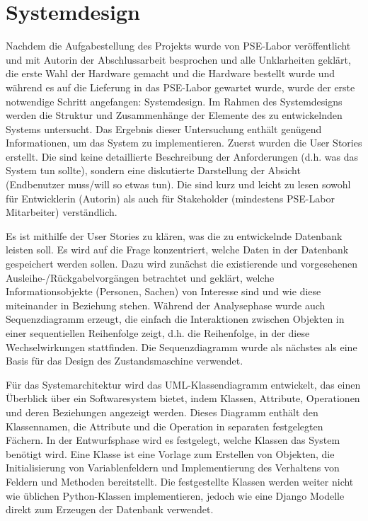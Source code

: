 \chapter{Systemdesign}
\label{sec:design}
Nachdem die Aufgabestellung des Projekts wurde von PSE-Labor veröffentlicht und mit Autorin der Abschlussarbeit besprochen und alle Unklarheiten geklärt, die erste Wahl der Hardware gemacht und die Hardware bestellt wurde und während es auf die Lieferung in das PSE-Labor gewartet wurde, wurde der erste notwendige Schritt angefangen: Systemdesign. Im Rahmen des Systemdesigns werden die Struktur und Zusammenhänge der Elemente des zu entwickelnden Systems untersucht. Das Ergebnis dieser Untersuchung enthält genügend Informationen, um das System zu implementieren. Zuerst wurden die User Stories erstellt. Die sind keine detaillierte Beschreibung der Anforderungen (d.h. was das System tun sollte), sondern eine diskutierte Darstellung der Absicht (Endbenutzer muss/will so etwas tun). Die sind kurz und leicht zu lesen sowohl für Entwicklerin (Autorin) als auch für Stakeholder (mindestens PSE-Labor Mitarbeiter) verständlich. 

Es ist mithilfe der User Stories zu klären, was die zu entwickelnde Datenbank leisten soll. Es wird auf die Frage konzentriert, welche Daten in der Datenbank gespeichert werden sollen. Dazu wird zunächst  die existierende und vorgesehenen Ausleihe-/Rückgabelvorgängen betrachtet und geklärt, welche Informationsobjekte (Personen, Sachen) von Interesse sind und wie diese miteinander in Beziehung stehen. Während der Analysephase wurde auch Sequenzdiagramm erzeugt, die einfach die Interaktionen zwischen Objekten in einer sequentiellen Reihenfolge zeigt, d.h. die Reihenfolge, in der diese Wechselwirkungen stattfinden. Die Sequenzdiagramm wurde als nächstes als eine Basis für das Design des Zustandsmaschine verwendet.  

Für das Systemarchitektur wird das UML-Klassendiagramm entwickelt, das einen Überblick über ein Softwaresystem bietet, indem Klassen, Attribute, Operationen und deren Beziehungen angezeigt werden. Dieses Diagramm enthält den Klassennamen, die Attribute und die Operation in separaten festgelegten Fächern. In der Entwurfsphase wird es festgelegt, welche Klassen das System benötigt wird. Eine Klasse ist eine Vorlage zum Erstellen von Objekten, die Initialisierung von Variablenfeldern und Implementierung des Verhaltens von Feldern und Methoden bereitstellt. Die festgestellte Klassen werden weiter nicht wie üblichen Python-Klassen implementieren, jedoch wie eine Django Modelle direkt zum Erzeugen der Datenbank verwendet. 





